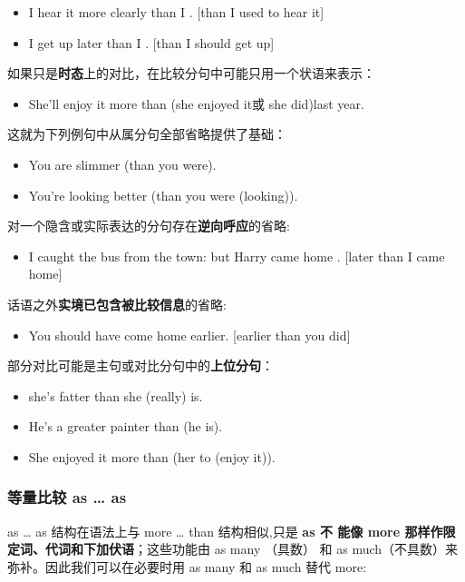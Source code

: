 \begin{itemize}
\item I hear it more clearly than I . [than I used to hear it]

\item I get up later than I . [than I should get up]
\end{itemize}

如果只是\textbf{时态}上的对比，在比较分句中可能只用一个状语来表示：
\begin{itemize}
\item She'll enjoy it more than (she enjoyed it或 she did)last year.
\end{itemize}
这就为下列例句中从属分句全部省略提供了基础：
\begin{itemize}
\item You are slimmer (than you were).
\item You're looking better (than you were (looking)).
\end{itemize}

对一个隐含或实际表达的分句存在\textbf{逆向呼应}的省略:
\begin{itemize}
\item I caught the bus from the town: but Harry came home . [later than I came home]
\end{itemize}


话语之外\textbf{实境已包含被比较信息}的省略:
\begin{itemize}
\item You should have come home earlier. [earlier than you did]
\end{itemize}

部分对比可能是主句或对比分句中的\textbf{上位分句}：
\begin{itemize}
\item {} she's fatter than she (really) is.
\item He's a greater painter than  (he is).
\item She enjoyed it more than  (her to (enjoy it)).
\end{itemize}

\subsubsection{等量比较 as \ldots{} as}

as \ldots{} as 结构在语法上与 more \ldots{} than 结构相似,只是 \textbf{as 不
  能像 more 那样作限定词、代词和下加伏语}；这些功能由 as many （具数） 和 as
much（不具数）来弥补。因此我们可以在必要时用 as many 和 as much 替代 more:

